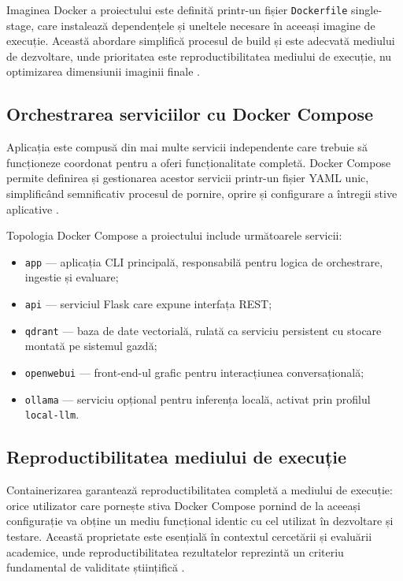 \documentclass[12pt, a4paper, oneside, romanian]{teza-upb}
\begin{document}
Imaginea Docker a proiectului este definită printr-un fișier 
\texttt{Dockerfile} single-stage, care instalează dependențele și 
uneltele necesare în aceeași imagine de execuție. Această abordare 
simplifică procesul de build și este adecvată mediului de dezvoltare, 
unde prioritatea este reproductibilitatea mediului de execuție, nu 
optimizarea dimensiunii imaginii finale \cite{docker_doc}.

\subsection{Orchestrarea serviciilor cu Docker Compose}

Aplicația este compusă din mai multe servicii independente care trebuie să funcționeze coordonat pentru a oferi funcționalitate completă. Docker Compose permite definirea și gestionarea acestor servicii printr-un fișier YAML unic, simplificând semnificativ procesul de pornire, oprire și configurare a întregii stive aplicative \cite{docker_compose_doc}.

Topologia Docker Compose a proiectului include următoarele servicii:
\begin{itemize}
  \item \texttt{app} — aplicația CLI principală, responsabilă pentru 
  logica de orchestrare, ingestie și evaluare;
  \item \texttt{api} — serviciul Flask care expune interfața REST;
  \item \texttt{qdrant} — baza de date vectorială, rulată ca serviciu 
  persistent cu stocare montată pe sistemul gazdă;
  \item \texttt{openwebui} — front-end-ul grafic pentru interacțiunea 
  conversațională;
  \item \texttt{ollama} — serviciu opțional pentru inferența locală, 
  activat prin profilul \texttt{local-llm}.
\end{itemize}

\subsection{Reproductibilitatea mediului de execuție}

Containerizarea garantează reproductibilitatea completă a mediului de execuție: orice utilizator care pornește stiva Docker Compose pornind de la aceeași configurație va obține un mediu funcțional identic cu cel utilizat în dezvoltare și testare. Această proprietate este esențială în contextul cercetării și evaluării academice, unde reproductibilitatea rezultatelor reprezintă un criteriu fundamental de validitate științifică \cite{reproducibility2018}.
\end{document}
